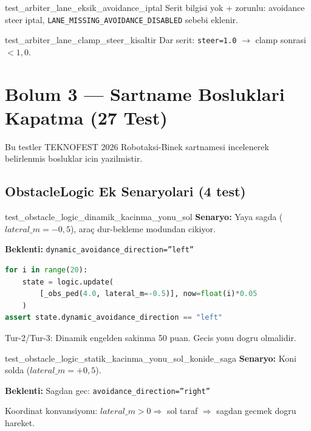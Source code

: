 \documentclass[a4paper,12pt]{article}
\begin{document}
\begin{testbox}{test\_arbiter\_lane\_eksik\_avoidance\_iptal}
Serit bilgisi yok + zorunlu: avoidance steer iptal,
\texttt{LANE\_MISSING\_AVOIDANCE\_DISABLED} sebebi eklenir.
\end{testbox}

\begin{testbox}{test\_arbiter\_lane\_clamp\_steer\_kisaltir}
Dar serit: \texttt{steer=1.0} $\to$ clamp sonrasi $< 1{,}0$.
\end{testbox}

\section{Bolum 3 --- Sartname Bosluklari Kapatma (27 Test)}

\begin{specbox}
Bu testler TEKNOFEST 2026 Robotaksi-Binek sartnamesi incelenerek
belirlenmis bosluklar icin yazilmistir.
\end{specbox}

\subsection{ObstacleLogic Ek Senaryolari (4 test)}

\begin{testbox}{test\_obstacle\_logic\_dinamik\_kacinma\_yonu\_sol}
\textbf{Senaryo:} Yaya sagda ($lateral\_m=-0{,}5$), araç
dur-bekleme modundan cikiyor.

\textbf{Beklenti:} \texttt{dynamic\_avoidance\_direction=''left''}

\begin{lstlisting}[language=Python]
for i in range(20):
    state = logic.update(
        [_obs_ped(4.0, lateral_m=-0.5)], now=float(i)*0.05
    )
assert state.dynamic_avoidance_direction == "left"
\end{lstlisting}

\begin{specbox}
Tur-2/Tur-3: Dinamik engelden sakinma 50 puan. Gecis yonu
dogru olmalidir.
\end{specbox}
\end{testbox}

\begin{testbox}{test\_obstacle\_logic\_statik\_kacinma\_yonu\_sol\_konide\_saga}
\textbf{Senaryo:} Koni solda ($lateral\_m=+0{,}5$).

\textbf{Beklenti:} Sagdan gec: \texttt{avoidance\_direction=''right''}

Koordinat konvansiyonu: $lateral\_m > 0 \Rightarrow$ sol taraf
$\Rightarrow$ sagdan gecmek dogru hareket.
\end{testbox}
\end{document}
